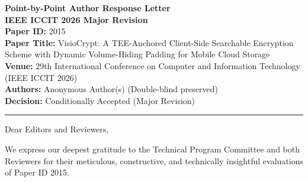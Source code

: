 \documentclass[11pt,a4paper]{article}
\begin{document}
\begin{center}
    {\LARGE \textbf{Point-by-Point Author Response Letter}}\\[1.5ex]
    {\large \textbf{IEEE ICCIT 2026 Major Revision}}\\[2ex]
    \textbf{Paper ID:} 2015\\[0.5ex]
    \textbf{Paper Title:} VisioCrypt: A TEE-Anchored Client-Side Searchable Encryption Scheme with Dynamic Volume-Hiding Padding for Mobile Cloud Storage\\[0.5ex]
    \textbf{Venue:} 29th International Conference on Computer and Information Technology (IEEE ICCIT 2026)\\[0.5ex]
    \textbf{Authors:} Anonymous Author(s) (Double-blind preserved)\\[0.5ex]
    \textbf{Decision:} Conditionally Accepted (Major Revision)
\end{center}

\vspace{1em}
\hrule
\vspace{1.5em}

\noindent Dear Editors and Reviewers,

\vspace{0.8em}
\noindent We express our deepest gratitude to the Technical Program Committee and both Reviewers for their meticulous, constructive, and technically insightful evaluations of Paper ID 2015. 
\end{document}
